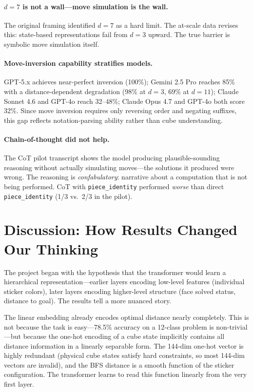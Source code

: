 \documentclass[12pt]{article}
\begin{document}
\paragraph{$d{=}7$ is not a wall---move simulation is the wall.}
The original framing identified $d{=}7$ as a hard limit.  The at-scale data
revises this: state-based representations fail from $d{=}3$ upward.  The true
barrier is symbolic move simulation itself.

\paragraph{Move-inversion capability stratifies models.}
GPT-5.x achieves near-perfect inversion (100\%); Gemini 2.5 Pro reaches 85\%
with a distance-dependent degradation (98\% at $d{=}3$, 69\% at $d{=}11$);
Claude Sonnet 4.6 and GPT-4o reach 32--48\%; Claude Opus 4.7 and GPT-4o both
score 32\%.  Since move inversion requires only reversing order and negating
suffixes, this gap reflects notation-parsing ability rather than cube understanding.

\paragraph{Chain-of-thought did not help.}
The CoT pilot transcript shows the model producing plausible-sounding reasoning
without actually simulating moves---the solutions it produced were wrong.  The
reasoning is \emph{confabulatory}: narrative about a computation that is not
being performed.  CoT with \texttt{piece\_identity} performed \emph{worse} than
direct \texttt{piece\_identity} (1/3 vs.\ 2/3 in the pilot).

\section{Discussion: How Results Changed Our Thinking}

The project began with the hypothesis that the transformer would learn a
hierarchical representation---earlier layers encoding low-level features
(individual sticker colors), later layers encoding higher-level structure
(face solved status, distance to goal).  The results tell a more nuanced story.

The linear embedding already encodes optimal distance nearly completely.  This is
not because the task is easy---78.5\% accuracy on a 12-class problem is non-trivial
---but because the one-hot encoding of a cube state implicitly contains all
distance information in a linearly separable form.  The 144-dim one-hot vector is
highly redundant (physical cube states satisfy hard constraints, so most
144-dim vectors are invalid), and the BFS distance is a smooth function of the
sticker configuration.  The transformer learns to read this function linearly
from the very first layer.
\end{document}
